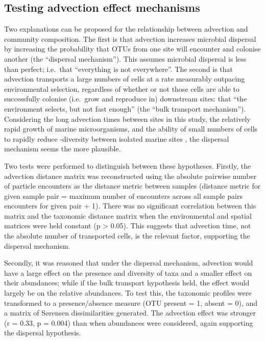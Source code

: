 

\subsection{Testing advection effect mechanisms}

Two explanations can be proposed for the relationship between advection and community composition.
The first is that advection increases microbial dispersal by increasing the probability that \acp{OTU} from one site will encounter and colonise another (the ``dispersal mechanism'').
This assumes microbial dispersal is less than perfect; i.e.\ that ``everything is not everywhere''.
The second is that advection transports a large numbers of cells at a rate measurably outpacing environmental selection, regardless of whether or not those cells are able to successfully colonise (i.e.\ grow and reproduce in) downstream sites: that ``the environment selects, but not fast enough'' (the ``bulk transport mechanism'').
Considering the long advection times between sites in this study, the relatively rapid growth of marine microorganisms, and the ability of small numbers of cells to rapidly reduce \textbeta{}-diversity between isolated marine sites \cite{Declerck:2013cz}, the dispersal mechanism seems the more plausible.

Two tests were performed to distinguish between these hypotheses.
Firstly, the advection distance matrix was reconstructed using the absolute pairwise number of particle encounters as the distance metric between samples (distance metric for given sample pair = maximum number of encounters across all sample pairs \textminus{} encounters for given pair + 1).
There was no significant correlation between this matrix and the taxonomic distance matrix when the environmental and spatial matrices were held constant (p \textgreater{} 0.05).
This suggests that advection time, not the absolute number of transported cells, is the relevant factor, supporting the dispersal mechanism.

Secondly, it was reasoned that under the dispersal mechanism, advection would have a large effect on the presence and diversity of taxa and a smaller effect on their abundances; while if the bulk transport hypothesis held, the effect would largely be on the relative abundances.
To test this, the taxonomic profiles were transformed to a presence/absence measure (\ac{OTU} present = 1, absent = 0), and a matrix of S\o{}rensen dissimilarities generated.
The advection effect was stronger (r = 0.33, p = 0.004) than when abundances were considered, again supporting the dispersal hypothesis. 

